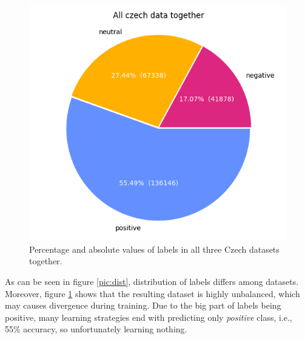\begin{figure}[!h]
\centering
\includegraphics[width=0.65\columnwidth]{../img/all.png}
\protect\caption{Percentage and absolute values of labels in all three Czech datasets together.}
\label{pic:dist_all}
\end{figure}
As can be seen in figure \ref{pic:dist}, distribution of labels differs among datasets. Moreover, figure \ref{pic:dist_all} shows that the resulting dataset is highly unbalanced, which may causes divergence during training. Due to the big part of labels being positive, many learning strategies end with predicting only \textit{positive} class, i.e., 55\% accuracy, so unfortunately learning nothing. 
